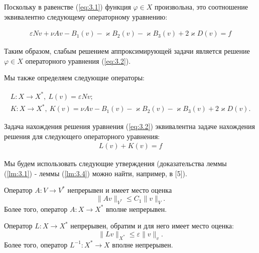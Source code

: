 Поскольку в равенстве (\ref{eq:3.1}) функция $\varphi \in X$ произвольна, это соотношение эквивалентно следующему операторному уравнению:

\begin{equation}\label{eq:3.2}
    \begin{gathered}
        \varepsilon N v + \nu A v - B_1(v) - \varkappa B_2(v) - \varkappa B_3(v) + 2 \varkappa D(v) = f
    \end{gathered}
\end{equation}

Таким образом, слабым решением аппроксимирующей задачи является решение $\varphi \in X$ операторного уравнения (\ref{eq:3.2}).

Мы также определяем следующие операторы:

\begin{equation*}
    \begin{gathered}
        L: X \rightarrow X^*, \ L(v) = \varepsilon N v; \\
        K: X \rightarrow X^*, \ K(v) = \nu A v - B_1(v) - \varkappa B_2(v) - \varkappa B_3(v) + 2 \varkappa D(v).
    \end{gathered}
\end{equation*}

Задача нахождения решения уравнения (\ref{eq:3.2}) эквивалентна задаче нахождения решения для следующего операторного уравнения:
\begin{equation}\label{eq:3.3}
    \begin{gathered}
        L(v)+K(v)=f
    \end{gathered}
\end{equation}

Мы будем использовать следующие утверждения (доказательства леммы (\ref{lm:3.1}) - леммы (\ref{lm:3.4}) можно найти, например, в [5]).
\begin{lemma}\label{lm:3.1}
    Оператор $A:V\rightarrow V^*$ непрерывен и имеет место оценка 
    $$\parallel Av\parallel_{V^*}\leqslant C_1\parallel v\parallel_V.$$
    Более того, оператор $A:X\rightarrow X^*$ вполне непрерывен.
\end{lemma}

\begin{lemma}\label{lm:3.2}
    Оператор $L:X\rightarrow X^*$ непрерывен, обратим и для него имеет место оценка:
    $$\parallel Lv\parallel_{X^*}\leqslant\varepsilon\parallel v\parallel_v.$$
    Более того, оператор $L^{-1}:X^*\rightarrow X$ вполне непрерывен.
\end{lemma}

